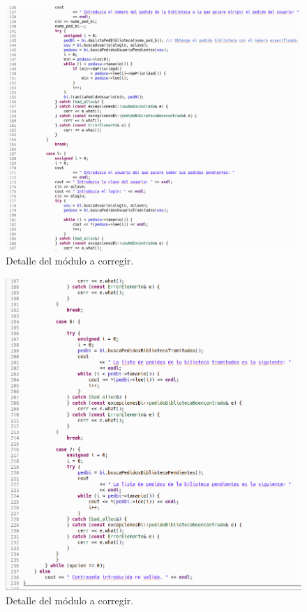  		\begin{figure}[H]
 			\centering
 			\includegraphics[scale=0.45]{img/captura99.png}
 			\caption{Detalle del módulo a corregir.}
 			\label{captura99}
 		\end{figure}
 		
 		\begin{figure}[H]
 			\centering
 			\includegraphics[scale=0.5]{img/captura100.png}
 			\caption{Detalle del módulo a corregir.}
 			\label{captura100}
 		\end{figure}
 	
